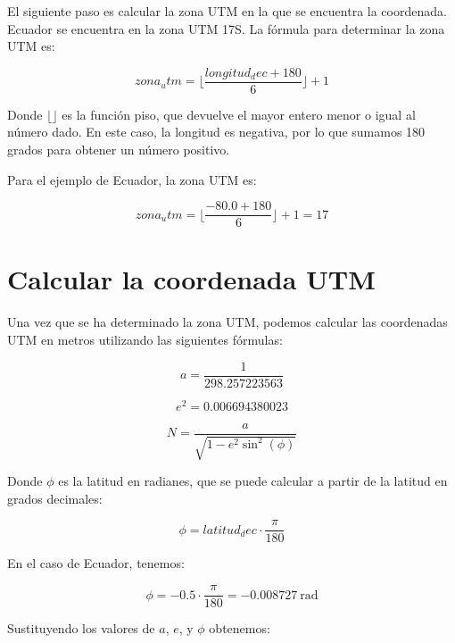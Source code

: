 \documentclass{article}
\begin{document}
El siguiente paso es calcular la zona UTM en la que se encuentra la coordenada. Ecuador se encuentra en la zona UTM 17S. La fórmula para determinar la zona UTM es:

\begin{equation}
zona_utm = \lfloor \frac{longitud_dec + 180}{6} \rfloor + 1
\end{equation}

Donde $\lfloor \rfloor$ es la función piso, que devuelve el mayor entero menor o igual al número dado. En este caso, la longitud es negativa, por lo que sumamos 180 grados para obtener un número positivo.

Para el ejemplo de Ecuador, la zona UTM es:

\begin{equation}
zona_utm = \lfloor \frac{-80.0 + 180}{6} \rfloor + 1 = 17
\end{equation}

\section{Calcular la coordenada UTM}

Una vez que se ha determinado la zona UTM, podemos calcular las coordenadas UTM en metros utilizando las siguientes fórmulas:

\begin{equation}
a = \frac{1}{298.257223563}
\end{equation}

\begin{equation}
e^2 = 0.006694380023
\end{equation}

\begin{equation}
N = \frac{a}{\sqrt{1-e^2\sin^2(\phi)}}
\end{equation}

Donde $\phi$ es la latitud en radianes, que se puede calcular a partir de la latitud en grados decimales:

\begin{equation}
\phi = latitud_dec \cdot \frac{\pi}{180}
\end{equation}

En el caso de Ecuador, tenemos:

\begin{equation}
\phi = -0.5 \cdot \frac{\pi}{180} = -0.008727\ \mathrm{rad}
\end{equation}

Sustituyendo los valores de $a$, $e$, y $\phi$ obtenemos:
\end{document}
